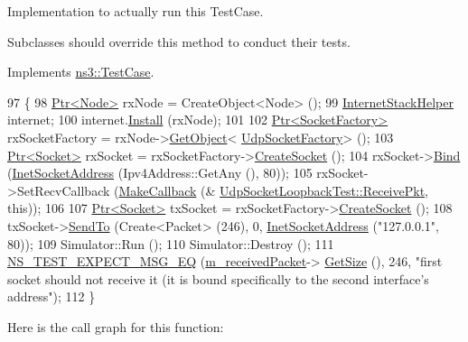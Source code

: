Implementation to actually run this Test\+Case. 

Subclasses should override this method to conduct their tests. 

Implements \hyperlink{classns3_1_1TestCase_a8ff74680cf017ed42011e4be51917a24}{ns3\+::\+Test\+Case}.


\begin{DoxyCode}
97 \{
98   \hyperlink{classns3_1_1Ptr}{Ptr<Node>} rxNode = CreateObject<Node> ();
99   \hyperlink{classns3_1_1InternetStackHelper}{InternetStackHelper} internet;
100   internet.\hyperlink{classns3_1_1InternetStackHelper_a6645b412f31283d2d9bc3d8a95cebbc0}{Install} (rxNode);
101 
102   \hyperlink{classns3_1_1Ptr}{Ptr<SocketFactory>} rxSocketFactory = rxNode->\hyperlink{classns3_1_1Object_a13e18c00017096c8381eb651d5bd0783}{GetObject}<
      \hyperlink{classns3_1_1UdpSocketFactory}{UdpSocketFactory}> ();
103   \hyperlink{classns3_1_1Ptr}{Ptr<Socket>} rxSocket = rxSocketFactory->\hyperlink{classns3_1_1SocketFactory_a97351e6e7860503a4912042530449f62}{CreateSocket} ();
104   rxSocket->\hyperlink{classns3_1_1Socket_ada93439a43de2028b5a8fc6621dad482}{Bind} (\hyperlink{classns3_1_1InetSocketAddress}{InetSocketAddress} (Ipv4Address::GetAny (), 80));
105   rxSocket->SetRecvCallback (\hyperlink{group__makecallbackmemptr_ga9376283685aa99d204048d6a4b7610a4}{MakeCallback} (&
      \hyperlink{classUdpSocketLoopbackTest_a97de9b7e8d7e9a245db7fe4582e0c99d}{UdpSocketLoopbackTest::ReceivePkt}, \textcolor{keyword}{this}));
106 
107   \hyperlink{classns3_1_1Ptr}{Ptr<Socket>} txSocket = rxSocketFactory->\hyperlink{classns3_1_1SocketFactory_a97351e6e7860503a4912042530449f62}{CreateSocket} ();
108   txSocket->\hyperlink{classns3_1_1Socket_af898fce6a58e0dbba23c1c6de1d4220e}{SendTo} (Create<Packet> (246), 0, \hyperlink{classns3_1_1InetSocketAddress}{InetSocketAddress} (\textcolor{stringliteral}{"127.0.0.1"}, 80));
109   Simulator::Run ();
110   Simulator::Destroy ();
111   \hyperlink{group__testing_ga7304ba46a28d8cf08dfdfd6499cf7068}{NS\_TEST\_EXPECT\_MSG\_EQ} (\hyperlink{classUdpSocketLoopbackTest_a14e3e2394b5c010739ba0cfe766cb951}{m\_receivedPacket}->
      \hyperlink{classns3_1_1Packet_a462855c9929954d4301a4edfe55f4f1c}{GetSize} (), 246, \textcolor{stringliteral}{"first socket should not receive it (it is bound specifically to the second
       interface's address"});
112 \}
\end{DoxyCode}


Here is the call graph for this function\+:


